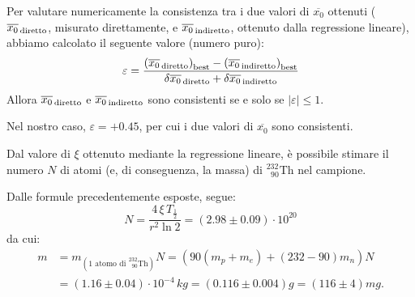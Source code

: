 \documentclass{article}
\newcommand*{\Th}{^{232}_{\;\;90} \text{Th}}
\begin{document}
Per valutare numericamente la consistenza tra i due valori di $\overline{x_0}$
ottenuti ($\overline{x_0}_\text{\,diretto}$, misurato direttamente, e
$\overline{x_0}_\text{\,indiretto}$, ottenuto dalla regressione lineare),
abbiamo calcolato il seguente valore (numero puro):
\[
    \varepsilon =
    \frac{
        \left(\overline{x_0}_\text{\,diretto}\right)_\text{best} -
        \left(\overline{x_0}_\text{\,indiretto}\right)_\text{best}
    }{
        \delta\overline{x_0}_\text{\,diretto} +
        \delta\overline{x_0}_\text{\,indiretto}
    }
\]
Allora $\overline{x_0}_\text{\,diretto}$ e $\overline{x_0}_\text{\,indiretto}$
sono consistenti se e solo se $\left|\varepsilon\right|\le1$.

Nel nostro caso, $\varepsilon = +0.45$, per cui i due valori di $\overline{x_0}$
sono consistenti.

Dal valore di $\xi$ ottenuto mediante la regressione lineare, è possibile stimare
il numero $N$ di atomi (e, di conseguenza, la massa) di $\Th$ nel campione.

Dalle formule precedentemente esposte, segue:
\[
    N = \frac{4\,\xi\,T_\frac{1}{2}}{r^2\ln{2}}
    = \left(2.98\pm0.09\right)\cdot10^{20}
\]
da cui:
\[\begin{aligned}
    m &= m_{\left(\text{1 atomo di }\Th\right)}N
       = (90(m_p+m_e) + (232-90)m_n)N\\
      &= \left(1.16\pm0.04\right)\cdot10^{-4}\,\unit{kg}
       = \left(0.116\pm0.004\right)\unit{g}
       = \left(116\pm4\right)\unit{mg}.
\end{aligned}\]
\end{document}
